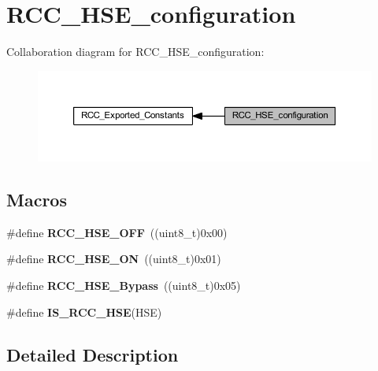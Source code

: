 \hypertarget{group___r_c_c___h_s_e__configuration}{}\section{R\+C\+C\+\_\+\+H\+S\+E\+\_\+configuration}
\label{group___r_c_c___h_s_e__configuration}
Collaboration diagram for R\+C\+C\+\_\+\+H\+S\+E\+\_\+configuration\+:
\nopagebreak
\begin{figure}[H]
\begin{center}
\leavevmode
\includegraphics[width=350pt]{group___r_c_c___h_s_e__configuration}
\end{center}
\end{figure}
\subsection*{Macros}
\begin{DoxyCompactItemize}
\item 
\mbox{\label{group___r_c_c___h_s_e__configuration_ga1616626d23fbce440398578855df6f97}} 
\#define {\bfseries R\+C\+C\+\_\+\+H\+S\+E\+\_\+\+O\+FF}~((uint8\+\_\+t)0x00)
\item 
\mbox{\label{group___r_c_c___h_s_e__configuration_gabc4f70a44776c557af20496b04d9a9db}} 
\#define {\bfseries R\+C\+C\+\_\+\+H\+S\+E\+\_\+\+ON}~((uint8\+\_\+t)0x01)
\item 
\mbox{\label{group___r_c_c___h_s_e__configuration_ga09061e9909d5f588baa7bfb0f7edd9fa}} 
\#define {\bfseries R\+C\+C\+\_\+\+H\+S\+E\+\_\+\+Bypass}~((uint8\+\_\+t)0x05)
\item 
\#define {\bfseries I\+S\+\_\+\+R\+C\+C\+\_\+\+H\+SE}(H\+SE)
\end{DoxyCompactItemize}


\subsection{Detailed Description}


